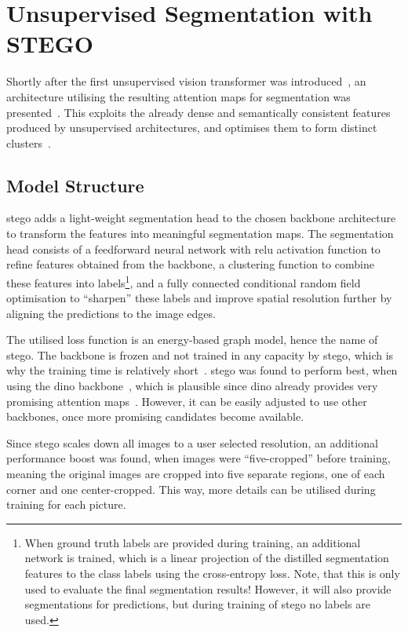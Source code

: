 \section{Unsupervised Segmentation with STEGO}\label{sec:stego}
Shortly after the first unsupervised vision transformer was introduced~\autocite{Caron2021}, an architecture utilising the resulting attention maps for segmentation was presented~\autocite{Hamilton2022}.
This  exploits the already dense and semantically consistent features produced by unsupervised architectures, and optimises them to form distinct clusters~\autocite{Hamilton2022}.

\subsection{Model Structure}
\gls{stego} adds a light-weight segmentation head to the chosen backbone architecture to transform the features into meaningful segmentation maps.
The segmentation head consists of a feedforward neural network with \gls{relu} activation function to refine features obtained from the backbone, a clustering function to combine these features into labels\footnote{When ground truth labels are provided during training, an additional network is trained, which is a linear projection of the distilled segmentation features to the class labels using the cross-entropy loss.
Note, that this is only used to evaluate the final segmentation results! However, it will also provide segmentations for predictions, but during training of \gls{stego} no labels are used.}, and a fully connected conditional random field optimisation to ``sharpen'' these labels and improve spatial resolution further by aligning the predictions to the image edges.~\autocite{Hamilton2022}

The utilised loss function is an energy-based graph model, hence the name of \gls{stego}.
The backbone is frozen and not trained in any capacity by \gls{stego}, which is why the training time is relatively short~\autocite{Hamilton2022}.
\gls{stego} was found to perform best, when using the \gls{dino} backbone~\autocite{Hamilton2022}, which is plausible since \gls{dino} already provides very promising attention maps~\autocite{Caron2021}.
However, it can be easily adjusted to use other backbones, once more promising candidates become available.

Since \gls{stego} scales down all images to a user selected resolution, an additional performance boost was found, when images were ``five-cropped'' before training, meaning the original images are cropped into five separate regions, one of each corner and one center-cropped.
This way, more details can be utilised during training for each picture.~\autocite{Hamilton2022}

